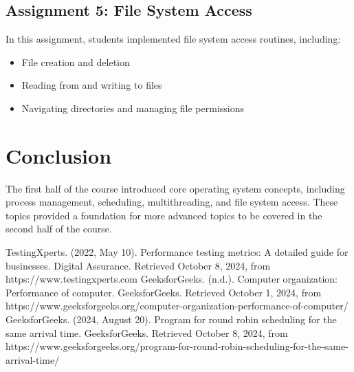 \documentclass[12pt]{article}
\begin{document}
\subsection{Assignment 5: File System Access}
In this assignment, students implemented file system access routines, including:
\begin{itemize}
    \item File creation and deletion
    \item Reading from and writing to files
    \item Navigating directories and managing file permissions
\end{itemize}

\section{Conclusion}
The first half of the course introduced core operating system concepts, including process management, scheduling, multithreading, and file system access. These topics provided a foundation for more advanced topics to be covered in the second half of the course.

\begin{thebibliography}{9}
    TestingXperts. (2022, May 10). Performance testing metrics: A detailed guide for businesses. Digital Assurance. Retrieved October 8, 2024, from https://www.testingxperts.com
    GeeksforGeeks. (n.d.). Computer organization: Performance of computer. GeeksforGeeks. Retrieved October 1, 2024, from https://www.geeksforgeeks.org/computer-organization-performance-of-computer/
    GeeksforGeeks. (2024, August 20). Program for round robin scheduling for the same arrival time. GeeksforGeeks. Retrieved October 8, 2024, from https://www.geeksforgeeks.org/program-for-round-robin-scheduling-for-the-same-arrival-time/
\end{thebibliography}
\end{document}
